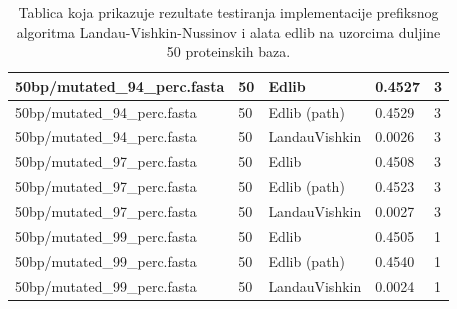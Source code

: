 \documentclass[times, utf8, zavrsni]{fer}
\begin{document}
\begin{table}[]
\begin{tabular}{|l|l|l|l|l|}
50bp/mutated\_94\_perc.fasta & 50                     & Edlib                          & 0.4527                       & 3                               \\ \hline
50bp/mutated\_94\_perc.fasta & 50                     & Edlib (path)                   & 0.4529                       & 3                               \\ \hline
50bp/mutated\_94\_perc.fasta & 50                     & LandauVishkin                  & 0.0026                       & 3                               \\ \hline
50bp/mutated\_97\_perc.fasta & 50                     & Edlib                          & 0.4508                       & 3                               \\ \hline
50bp/mutated\_97\_perc.fasta & 50                     & Edlib (path)                   & 0.4523                       & 3                               \\ \hline
50bp/mutated\_97\_perc.fasta & 50                     & LandauVishkin                  & 0.0027                       & 3                               \\ \hline
50bp/mutated\_99\_perc.fasta & 50                     & Edlib                          & 0.4505                       & 1                               \\ \hline
50bp/mutated\_99\_perc.fasta & 50                     & Edlib (path)                   & 0.4540                       & 1                               \\ \hline
50bp/mutated\_99\_perc.fasta & 50                     & LandauVishkin                  & 0.0024                       & 1                               \\ \hline
\end{tabular}
\caption{Tablica koja prikazuje rezultate testiranja implementacije prefiksnog algoritma Landau-Vishkin-Nussinov i alata edlib na uzorcima duljine 50 proteinskih baza.}
\label{tab:resultsPrefix50}
\end{table}
\end{document}
